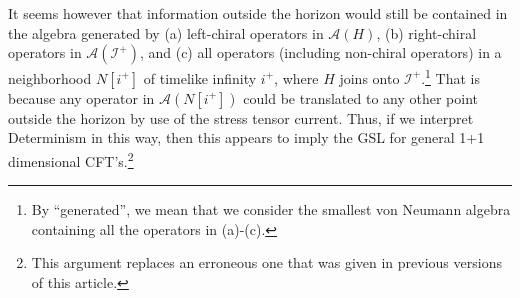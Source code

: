 \documentclass[12pt]{article}
\begin{document}
It seems however that information outside the horizon would still be contained in the algebra generated by (a) left-chiral operators in $\mathcal{A}(H)$, (b) right-chiral operators in $\mathcal{A}(\mathcal{I}^+)$, and (c) all operators (including non-chiral operators) in a neighborhood $N[i^+]$ of timelike infinity $i^+$, where $H$ joins onto $\mathcal{I}^+$.\footnote{By ``generated'', we mean that we consider the smallest von Neumann algebra containing all the operators in (a)-(c).}  That is because any operator in $\mathcal{A}(N[i^+])$ could be translated to any other point outside the horizon by use of the stress tensor current.  Thus, if we interpret Determinism in this way, then this appears to imply the GSL for general 1+1 dimensional CFT's.\footnote{This argument replaces an erroneous one that was given in previous versions of this article.}


\end{document}
